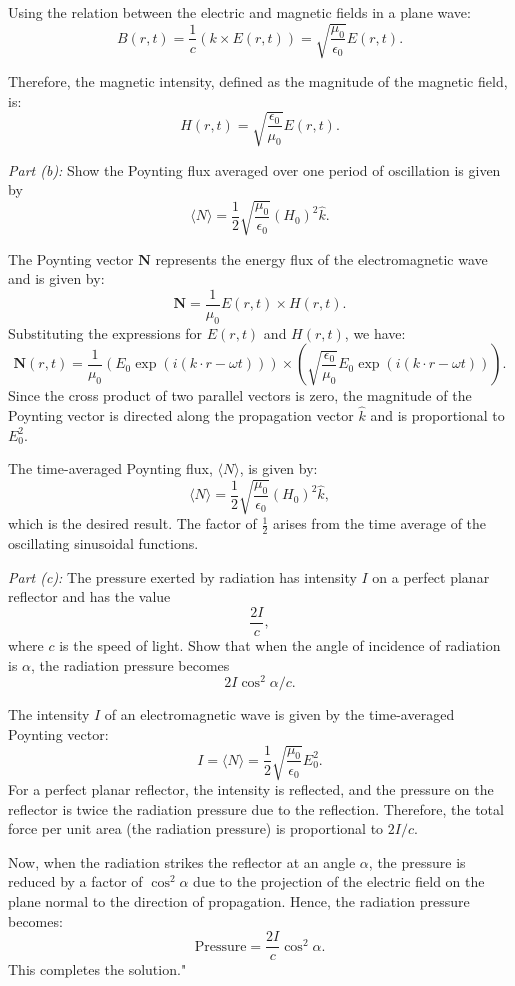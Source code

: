 Using the relation between the electric and magnetic fields in a plane wave:
\[
B(r, t) = \frac{1}{c} (k \times E(r, t)) = \sqrt{\frac{\mu_0}{\epsilon_0}} E(r, t).
\]

Therefore, the magnetic intensity, defined as the magnitude of the magnetic field, is:
\[
H(r, t) = \sqrt{\frac{\epsilon_0}{\mu_0}} E(r, t).
\]

\textit{Part (b):} Show the Poynting flux averaged over one period of oscillation is given by
\[
\langle N \rangle = \frac{1}{2} \sqrt{\frac{\mu_0}{\epsilon_0}} (H_0)^2 \hat{k}.
\]

The Poynting vector \( \mathbf{N} \) represents the energy flux of the electromagnetic wave and is given by:
\[
\mathbf{N} = \frac{1}{\mu_0} E(r,t) \times H(r,t).
\]
Substituting the expressions for \(E(r,t)\) and \(H(r,t)\), we have:
\[
\mathbf{N}(r, t) = \frac{1}{\mu_0} \left( E_0 \exp(i(k \cdot r - \omega t)) \right) \times \left( \sqrt{\frac{\epsilon_0}{\mu_0}} E_0 \exp(i(k \cdot r - \omega t)) \right).
\]
Since the cross product of two parallel vectors is zero, the magnitude of the Poynting vector is directed along the propagation vector \(\hat{k}\) and is proportional to \(E_0^2\).

The time-averaged Poynting flux, \( \langle N \rangle \), is given by:
\[
\langle N \rangle = \frac{1}{2} \sqrt{\frac{\mu_0}{\epsilon_0}} (H_0)^2 \hat{k},
\]
which is the desired result. The factor of \(\frac{1}{2}\) arises from the time average of the oscillating sinusoidal functions.

\textit{Part (c):} The pressure exerted by radiation has intensity \(I\) on a perfect planar reflector and has the value
\[
\frac{2I}{c},
\]
where \(c\) is the speed of light. Show that when the angle of incidence of radiation is \(\alpha\), the radiation pressure becomes
\[
2I \cos^2 \alpha / c.
\]

The intensity \(I\) of an electromagnetic wave is given by the time-averaged Poynting vector:
\[
I = \langle N \rangle = \frac{1}{2} \sqrt{\frac{\mu_0}{\epsilon_0}} E_0^2.
\]
For a perfect planar reflector, the intensity is reflected, and the pressure on the reflector is twice the radiation pressure due to the reflection. Therefore, the total force per unit area (the radiation pressure) is proportional to \(2I/c\).

Now, when the radiation strikes the reflector at an angle \(\alpha\), the pressure is reduced by a factor of \(\cos^2 \alpha\) due to the projection of the electric field on the plane normal to the direction of propagation. Hence, the radiation pressure becomes:
\[
\text{Pressure} = \frac{2I}{c} \cos^2 \alpha.
\]
This completes the solution."

